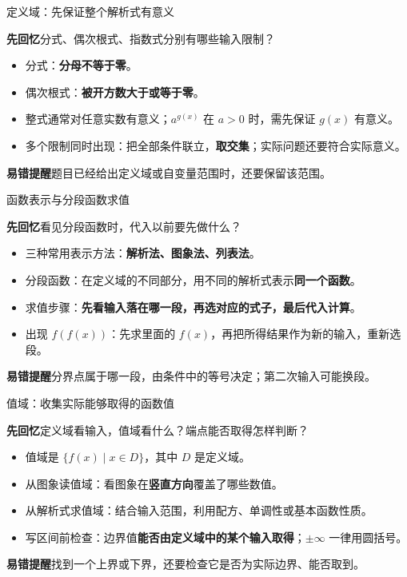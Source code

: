 \documentclass[UTF8,10pt,aspectratio=169,handout]{ctexbeamer}
\newcommand{\Recall}[1]{\par\noindent\textcolor{KnowledgeBlue}{\textbf{先回忆}\quad #1}\par\vspace{0.3cm}}
\newcommand{\Pitfall}[1]{\par\vspace{0.22cm}\noindent\textbf{易错提醒}\quad #1\par}
\begin{document}
\begin{frame}[t]{定义域：先保证整个解析式有意义}
\large
\Recall{分式、偶次根式、指数式分别有哪些输入限制？}
\pause
\begin{itemize}
  \item 分式：\textbf{分母不等于零}。
  \item 偶次根式：\textbf{被开方数大于或等于零}。
  \item 整式通常对任意实数有意义；$a^{g(x)}$ 在 $a>0$ 时，需先保证 $g(x)$ 有意义。
  \item 多个限制同时出现：把全部条件联立，\textbf{取交集}；实际问题还要符合实际意义。
\end{itemize}
\Pitfall{题目已经给出定义域或自变量范围时，还要保留该范围。}
\end{frame}

\begin{frame}[t]{函数表示与分段函数求值}
\large
\Recall{看见分段函数时，代入以前要先做什么？}
\pause
\begin{itemize}
  \item 三种常用表示方法：\textbf{解析法、图象法、列表法}。
  \item 分段函数：在定义域的不同部分，用不同的解析式表示\textbf{同一个函数}。
  \item 求值步骤：\textbf{先看输入落在哪一段，再选对应的式子，最后代入计算}。
  \item 出现 $f(f(x))$：先求里面的 $f(x)$，再把所得结果作为新的输入，重新选段。
\end{itemize}
\Pitfall{分界点属于哪一段，由条件中的等号决定；第二次输入可能换段。}
\end{frame}

\begin{frame}[t]{值域：收集实际能够取得的函数值}
\large
\Recall{定义域看输入，值域看什么？端点能否取得怎样判断？}
\pause
\begin{itemize}
  \item 值域是 $\{f(x)\mid x\in D\}$，其中 $D$ 是定义域。
  \item 从图象读值域：看图象在\textbf{竖直方向}覆盖了哪些数值。
  \item 从解析式求值域：结合输入范围，利用配方、单调性或基本函数性质。
  \item 写区间前检查：边界值\textbf{能否由定义域中的某个输入取得}；$\pm\infty$ 一律用圆括号。
\end{itemize}
\Pitfall{找到一个上界或下界，还要检查它是否为实际边界、能否取到。}
\end{frame}
\end{document}
